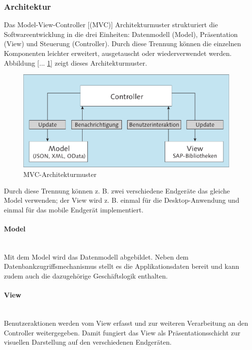 \subsubsection{Architektur}
\glqq Das Model-View-Controller [(MVC)] Architekturmuster strukturiert die Softwareentwicklung in die drei Einheiten: Datenmodell (Model), Präsentation (View) und Steuerung (Controller). Durch diese Trennung können die einzelnen Komponenten leichter erweitert, ausgetauscht oder wiederverwendet werden. Abbildung [... \ref{fig:mvcarch}] zeigt dieses Architekturmuster.
	
\vspace{1em}
\begin{figure}[htb]
  \centering
  \includegraphics[width=0.8\linewidth]{abb/mvc_arch2}
  \caption[MVC-Architekturmuster]{MVC-Architekturmuster \cite[S.124]{AntoEinf2014}}
  \label{fig:mvcarch}
\end{figure}

Durch diese Trennung können z. B. zwei verschiedene Endgeräte das gleiche Model verwenden; der View wird z. B. einmal für die Desktop-Anwendung und einmal für das mobile Endgerät implementiert.\grqq{}\cite[S.123]{AntoEinf2014}

\paragraph{Model}$\;$ \\
Mit dem Model wird das Datenmodell abgebildet. Neben dem Datenbankzugriffsmechanismus stellt es die Applikationsdaten bereit und kann zudem auch die dazugehörige Geschäftslogik enthalten.

\paragraph{View}$\;$ \\
Benutzeraktionen werden vom View erfasst und zur weiteren Verarbeitung an den Controller weitergegeben. Damit fungiert das View als Präsentationsschicht zur visuellen Darstellung auf den verschiedenen Endgeräten.

